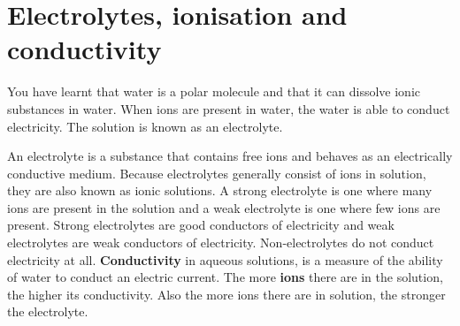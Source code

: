             \section{Electrolytes, ionisation and conductivity}
            \nopagebreak
      \label{m38720*id338608}You have learnt that water is a polar molecule and that it can dissolve ionic substances in water. When ions are present in water, the water is able to conduct electricity. The solution is known as an electrolyte.\par 
\label{m38720*fhsst!!!underscore!!!id635}
 {  An electrolyte is a substance that contains free ions and behaves as an electrically conductive medium.   } 
Because electrolytes generally consist of ions in solution, they are also known as ionic solutions. A strong electrolyte is one where many ions are present in the solution and a weak electrolyte is one where few ions are present. Strong electrolytes are good conductors of electricity and weak electrolytes are weak conductors of electricity. Non-electrolytes do not conduct electricity at all. 
\textbf{Conductivity} in aqueous solutions, is a measure of the ability of water to conduct an electric current. The more \textbf{ions} there are in the solution, the higher its conductivity. Also the more ions there are in solution, the stronger the electrolyte. 
      \label{m38720*uid56}
